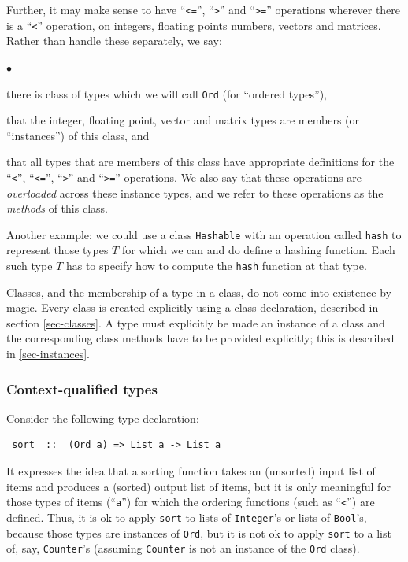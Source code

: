 \documentclass[twoside,letterpaper]{article}
\newenvironment{tightlist}%
{\begin{list}{$\bullet$}{%
    \setlength{\topsep}{0in}
    \setlength{\partopsep}{0in}
    \setlength{\itemsep}{0in}
    \setlength{\parsep}{0in}
    \setlength{\leftmargin}{1.5em}
    \setlength{\rightmargin}{0in}
    \setlength{\itemindent}{0in}
}
}%
{\end{list}
}
\newcommand{\te}[1]{\texttt{#1}}
\newcommand{\qbs}[1]{``\mbox{\te{#1}}''}
\begin{document}
Further, it may make sense to have {\qbs{<=}}, {\qbs{>}} and
{\qbs{>=}} operations wherever there is a {\qbs{<}} operation, on
integers, floating points numbers, vectors and matrices.  Rather than
handle these separately, we say:
\begin{tightlist}
\item
there is class of types which we will call {\te{Ord}} (for ``ordered
types''),

\item
that the integer, floating point, vector and matrix types are members
(or ``instances'') of this class, and

\item
that all types that are members of this class have appropriate
definitions for the {\qbs{<}}, {\qbs{<=}}, {\qbs{>}} and {\qbs{>=}}
operations.  We also say that these operations are {\emph{overloaded}}
across these instance types, and we refer to these operations as the
{\emph{methods}} of this class.

\end{tightlist}
Another example: we could use a class {\te{Hashable}} with an
operation called {\te{hash}} to represent those types $T$ for which we
can and do define a hashing function.  Each such type $T$ has to
specify how to compute the {\te{hash}} function at that type.

Classes, and the membership of a type in a class, do not come into
existence by magic.  Every class is created explicitly using a class
declaration, described in section {\ref{sec-classes}}.  A type must
explicitly be made an instance of a class and the corresponding class
methods have to be provided explicitly; this is described in
{\ref{sec-instances}}.


\subsubsection{Context-qualified types}

Consider the following type declaration:
\begin{verbatim}
 sort  ::  (Ord a) => List a -> List a
\end{verbatim}
It expresses the idea that a sorting function takes an (unsorted)
input list of items and produces a (sorted) output list of items, but
it is only meaningful for those types of items (\qbs{a}) for which the
ordering functions (such as {\qbs{<}}) are defined.  Thus, it is ok to
apply {\te{sort}} to lists of {\te{Integer}}'s or lists of
{\te{Bool}}'s, because those types are instances of {\te{Ord}}, but it
is not ok to apply {\te{sort}} to a list of, say, {\te{Counter}}'s
(assuming {\te{Counter}} is not an instance of the {\te{Ord}} class).
\end{document}
